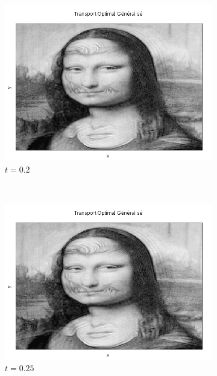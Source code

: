 \documentclass[a4paper,12pt]{article}
\begin{document}
\begin{figure}[!h]
\begin{subfigure}[b]{0.23\linewidth}
\includegraphics[width=\linewidth]{img/2DMorphing/T_00045.png}
\caption*{$t=0.2$}
\end{subfigure}
~
\begin{subfigure}[b]{0.23\linewidth}
\includegraphics[width=\linewidth]{img/2DMorphing/T_00056.png}
\caption*{$t=0.25$}
\end{subfigure}
~
\begin{subfigure}[b]{0.23\linewidth}

\end{subfigure}
\end{figure}
\end{document}
